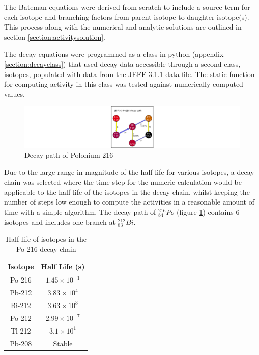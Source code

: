The Bateman equations were derived from scratch to include a source term for each isotope and branching factors from parent isotope to daughter isotope(s).  This process along with the numerical and analytic solutions are outlined in section \ref{section:activitysolution}.

\FloatBarrier

The decay equations were programmed as a class in python (appendix \ref{section:decayclass}) that used decay data accessible through a second class, isotopes, populated with data from the JEFF 3.1.1 data file.  The static function for computing activity in this class was tested against numerically computed values.  

\begin{figure}[h]
  \begin{center}
    \includegraphics[width=0.7\linewidth]{chapters/activity_code/84po216/84Po216_path.png}
    \caption{Decay path of Polonium-216}
    \label{fig:DecayPathPo216}
  \end{center}
\end{figure}

Due to the large range in magnitude of the half life for various isotopes, a decay chain was selected where the time step for the numeric calculation would be applicable to the half life of the isotopes in the decay chain, whilst keeping the number of steps low enough to compute the activities in a reasonable amount of time with a simple algorithm.  The decay path of  ${}^{216}_{84}Po$ (figure \ref{fig:DecayPathPo216}) contains 6 isotopes and includes one branch at ${}^{212}_{83}Bi$.

\begin{table}[h]
\begin{center}
\begin{tabular}{c c}
\hline\hline
Isotope & Half Life (s)\\
\hline\hline
Po-216 & $1.45 \times 10^{-1}$ \\
Pb-212 & $3.83 \times 10^{4}$ \\
Bi-212 & $3.63 \times 10^{3}$ \\
Po-212 & $2.99 \times 10^{-7}$ \\
Tl-212 & $3.1 \times 10^{1}$ \\
Pb-208 & Stable \\
\hline\hline
\end{tabular}
\end{center}
\caption{Half life of isotopes in the Po-216 decay chain}
\label{table:po216halflives}
\end{table}


